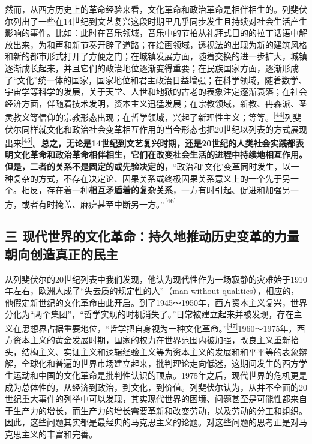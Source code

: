 \documentclass[UTF8, fontset = sourcesans, a4paper, oneside, zihao =
-4, scheme=chinese, no-math, space=true]{ctexbook}
\begin{document}
然而，从西方历史上的革命经验来看，文化革命和政治革命是相伴相生的。列斐伏尔列出了一些在14世纪到文艺复兴这段时期里几乎同步发生且持续对社会生活产生影响的事件。比如：此时在音乐领域，音乐中的节拍从礼拜式目的的拉丁话语中解放出来，为和声和新节奏开辟了道路；在绘画领域，透视法的出现为新的建筑风格和新的都市形式打开了方便之门；在城镇发展方面，随着交换的进一步扩大，城镇逐渐成长起来，并且它们的政治地位逐渐变得重要；在民族国家方面，逐渐形成了``文化''统一体的国家，国家地位和君主政治日益增强；在科学领域，随着数学、宇宙学等科学的发展，关于天堂、人世和地狱的古老的表象注定逐渐衰落；在社会经济方面，伴随着技术发明，资本主义迅猛发展；在宗教领域，新教、冉森派、圣灵教义等信仰的宗教形态出现；在哲学领域，兴起了新理性主义；等等。\protect\hypertarget{part0008_split_003.htmlux5cux23w44}{}{}\protect\hyperlink{part0008_split_003.htmlux5cux23m44}{\textsuperscript{{[}44{]}}}列斐伏尔同样就文化和政治社会变革相互作用的当今形态也把20世纪以列表的方式展现出来\protect\hypertarget{part0008_split_003.htmlux5cux23w45}{}{}\protect\hyperlink{part0008_split_003.htmlux5cux23m45}{\textsuperscript{{[}45{]}}}。\textbf{总之，无论是14世纪到文艺复兴时期，还是20世纪的人类社会实践都表明文化革命和政治革命相伴相生，它们在改变社会生活的进程中持续地相互作用。但是，二者的关系不是固定的或先验决定的，}``政治和`文化'变革同时发生，以一种复杂的方式，不存在决定论、因果关系或终极因果关系意义上的一个先于另一个。相反，存在着一种\textbf{相互矛盾着的复杂关系}，一方有时引起、促进和加强另一方，或者有时掩盖、麻痹甚至中断另一方。''\protect\hypertarget{part0008_split_003.htmlux5cux23w46}{}{}\protect\hyperlink{part0008_split_003.htmlux5cux23m46}{\textsuperscript{{[}46{]}}}

\subsection{三
现代世界的文化革命：持久地推动历史变革的力量朝向创造真正的民主}\label{part0008_split_003.htmlux5cux23c045}

从列斐伏尔的20世纪列表中我们发现，他认为现代性作为一场寂静的灾难始于1910年左右，欧洲人成了``失去质的规定性的人''（man
without
qualities），相应的，他假定新世纪的文化革命由此开启。到了1945～1950年，西方资本主义复兴，世界分化为``两个集团''，``哲学实现的时机消失了。''日常被建立起来并被发现，存在主义在思想界占据重要地位，``哲学把自身视为一种文化革命。''\protect\hypertarget{part0008_split_003.htmlux5cux23w47}{}{}\protect\hyperlink{part0008_split_003.htmlux5cux23m47}{\textsuperscript{{[}47{]}}}1960～1975年，西方资本主义的黄金发展时期，国家的权力在世界范围内被加强，改良主义重新抬头，结构主义、实证主义和逻辑经验主义等为资本主义的发展和和平平等的表象辩解，全球化和普遍的世界市场建立起来，批判理论走向低迷，这期间发生的西方学生运动和中国的文化革命是批判性认识的顶点。1975年之后，现代世界的危机更是成为总体性的，从经济到政治，到文化，到价值。列斐伏尔认为，从并不全面的20世纪重大事件的列举中可以发现，其实现代世界的困境、问题甚至是可能性都来自于生产力的增长，而生产力的增长需要革新和改变劳动，以及劳动的分工和组织。因此，这些问题其实都是最经典的马克思主义的论题。对这些问题的思考正是对马克思主义的丰富和完善。
\end{document}
